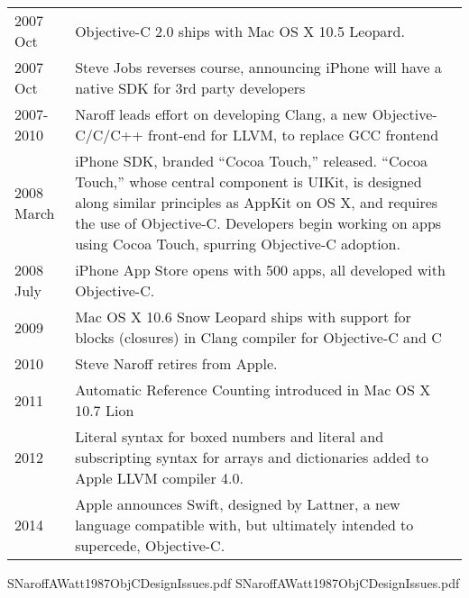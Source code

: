 \documentclass[acmsmall]{acmart}\settopmatter{}
\begin{document}
\begin{longtable}{lp{4.40in}}
2007 Oct 	& Objective-C 2.0 ships with Mac OS X 10.5 Leopard. \\
2007 Oct 	& Steve Jobs reverses course, announcing iPhone will have a native SDK for 3rd party developers \\
2007-2010	& Naroff leads effort on developing Clang, a new Objective-C/C/C++ front-end for LLVM, to replace GCC frontend \\
2008 March	& iPhone SDK, branded ``Cocoa Touch,'' released. ``Cocoa Touch,'' whose central component is UIKit, is designed along similar principles as AppKit on OS X, and requires the use of Objective-C. Developers begin working on apps using Cocoa Touch, spurring Objective-C adoption. \\
2008 July	& iPhone App Store opens with 500 apps, all developed with Objective-C. \\
2009	& Mac OS X 10.6 Snow Leopard ships with support for blocks (closures) in Clang compiler for Objective-C and C \\
2010	& Steve Naroff retires from Apple. \\
2011	& Automatic Reference Counting introduced in Mac OS X 10.7 Lion \\
2012	& Literal syntax for boxed numbers and literal and subscripting syntax for arrays and dictionaries added to Apple LLVM compiler 4.0. \\
2014	& Apple announces Swift, designed by Lattner, a new language compatible with, but ultimately intended to supercede, Objective-C. \\



\end{longtable}

{SNaroffAWatt1987ObjCDesignIssues.pdf}
 {SNaroffAWatt1987ObjCDesignIssues.pdf}
\end{document}
